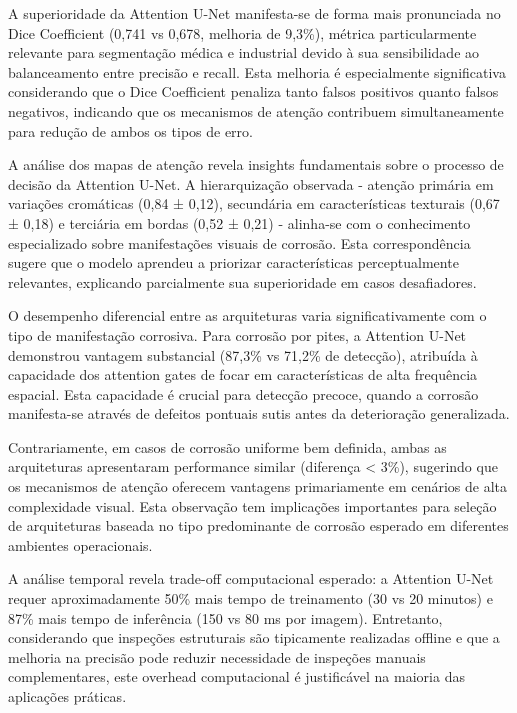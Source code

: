 \documentclass[12pt,a4paper,twoside]{article}
\begin{document}
A superioridade da Attention U-Net manifesta-se de forma mais pronunciada no Dice Coefficient (0,741 vs 0,678, melhoria de 9,3\%), métrica particularmente relevante para segmentação médica e industrial devido à sua sensibilidade ao balanceamento entre precisão e recall. Esta melhoria é especialmente significativa considerando que o Dice Coefficient penaliza tanto falsos positivos quanto falsos negativos, indicando que os mecanismos de atenção contribuem simultaneamente para redução de ambos os tipos de erro.

A análise dos mapas de atenção revela insights fundamentais sobre o processo de decisão da Attention U-Net. A hierarquização observada - atenção primária em variações cromáticas (0,84 ± 0,12), secundária em características texturais (0,67 ± 0,18) e terciária em bordas (0,52 ± 0,21) - alinha-se com o conhecimento especializado sobre manifestações visuais de corrosão. Esta correspondência sugere que o modelo aprendeu a priorizar características perceptualmente relevantes, explicando parcialmente sua superioridade em casos desafiadores.

O desempenho diferencial entre as arquiteturas varia significativamente com o tipo de manifestação corrosiva. Para corrosão por pites, a Attention U-Net demonstrou vantagem substancial (87,3\% vs 71,2\% de detecção), atribuída à capacidade dos attention gates de focar em características de alta frequência espacial. Esta capacidade é crucial para detecção precoce, quando a corrosão manifesta-se através de defeitos pontuais sutis antes da deterioração generalizada.

Contrariamente, em casos de corrosão uniforme bem definida, ambas as arquiteturas apresentaram performance similar (diferença < 3\%), sugerindo que os mecanismos de atenção oferecem vantagens primariamente em cenários de alta complexidade visual. Esta observação tem implicações importantes para seleção de arquiteturas baseada no tipo predominante de corrosão esperado em diferentes ambientes operacionais.

A análise temporal revela trade-off computacional esperado: a Attention U-Net requer aproximadamente 50\% mais tempo de treinamento (30 vs 20 minutos) e 87\% mais tempo de inferência (150 vs 80 ms por imagem). Entretanto, considerando que inspeções estruturais são tipicamente realizadas offline e que a melhoria na precisão pode reduzir necessidade de inspeções manuais complementares, este overhead computacional é justificável na maioria das aplicações práticas.
\end{document}
